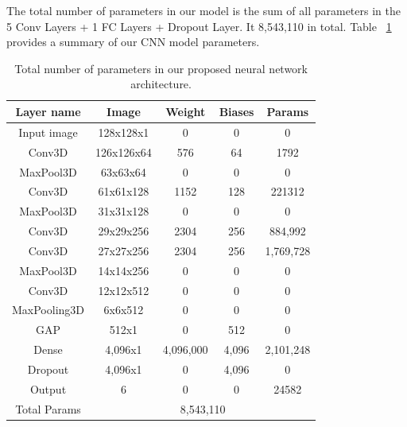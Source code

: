 The total number of parameters in our model is the sum of all parameters in the 5 Conv Layers + 1 FC Layers + Dropout Layer. It 8,543,110 in total. Table ~\ref{tab:CNNmodelarchi} provides a summary of our CNN model parameters.


\begin{table}[ht]
\caption{Total number of parameters in our proposed neural network architecture.}
\centering
\begin{tabular}{|c|c|c|c|c|}
\hline
\textbf{Layer  name} & \textbf{Image} & \textbf{Weight} & \textbf{Biases} & \textbf{Params} \\ \hline
Input image & 128x128x1 & 0 & 0 & 0 \\ \hline
Conv3D & 126x126x64 & 576 & 64 & 1792 \\ \hline
MaxPool3D & 63x63x64 & 0 & 0 & 0 \\ \hline
Conv3D & 61x61x128 & 1152 & 128 & 221312 \\ \hline
MaxPool3D & 31x31x128 & 0 & 0 & 0 \\ \hline
Conv3D & 29x29x256 & 2304 & 256 & 884,992 \\ \hline
Conv3D & 27x27x256 & 2304 & 256 & 1,769,728 \\ \hline
MaxPool3D & 14x14x256 & 0 & 0 & 0 \\ \hline
Conv3D & 12x12x512 & 0 & 0 & 0 \\ \hline
MaxPooling3D & 6x6x512 & 0 & 0 & 0 \\ \hline
GAP & 512x1 & 0 & 512 & 0 \\ \hline
Dense & 4,096x1 & 4,096,000 & 4,096 & 2,101,248 \\ \hline
Dropout & 4,096x1 & 0 & 4,096 & 0 \\ \hline
Output & 6 & 0 & 0 & 24582 \\ \hline
Total Params & \multicolumn{4}{c|}{8,543,110} \\ \hline
\end{tabular}
\label{tab:CNNmodelarchi}
\end{table}\hfill


